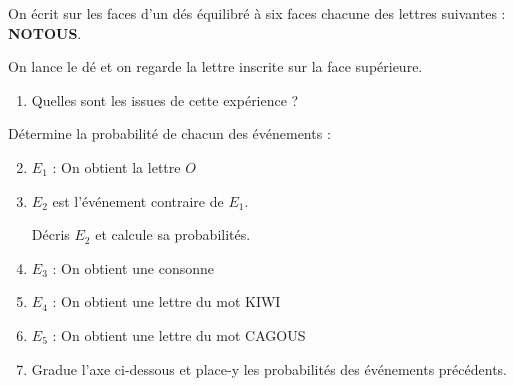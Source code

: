 \documentclass[a4paper,10pt]{report}
\begin{document}
\vspace{-1mm}
\begin{ex}
On écrit sur les faces d'un dés équilibré à six faces chacune des lettres suivantes : \textbf{NOTOUS}.

\noindent On lance le dé et on regarde la lettre inscrite sur la face supérieure.

\begin{enumerate}[font=\color{exer2}]
\item Quelles sont les issues de cette expérience ? 
\end{enumerate}
Détermine la probabilité de chacun des événements :

\noindent \begin{minipage}{7.5cm}
\begin{enumerate}[font=\color{exer2}]
\setcounter{enumi}{1}
\item $E_1$ : \og On obtient la lettre $O$ \fg{} 
\item $E_2$ est l'événement contraire de  $E_1$. 

Décris $E_2$ et calcule sa probabilités.
\item $E_3$ : \og On obtient une consonne \fg{} 
\end{enumerate}
\end{minipage}
\begin{minipage}{7.5cm}
\begin{enumerate}[font=\color{exer2}]
\setcounter{enumi}{4}
\item $E_4$ : \og On obtient une lettre du mot KIWI \fg{} 
\item $E_5$ : \og On obtient une lettre du mot CAGOUS \fg{} 
\item Gradue l'axe ci-dessous et place-y les probabilités des événements précédents.
\end{enumerate}
\end{minipage}

\begin{center}
\end{center}
\end{ex}
\end{document}
